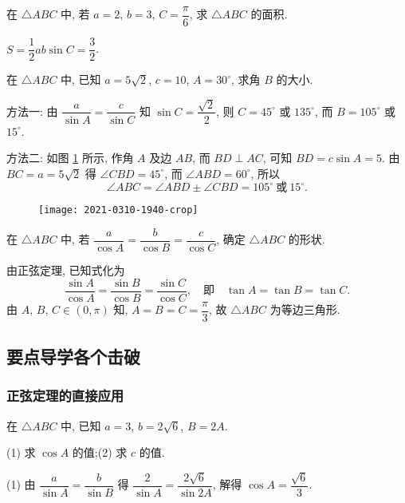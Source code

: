 \begin{exercise}
    在 $\triangle ABC$ 中, 若 $a=2$, $b=3$, $C=\dfrac\pi6$, 
    求 $\triangle ABC$ 的面积.
\end{exercise}
\beginsolution
    $S= \dfrac12 ab\sin C= \dfrac32$.
\endsolution

\begin{exercise}
    在 $\triangle ABC$ 中, 已知 $a=5\sqrt2$, $c=10$, $A=30^\circ$, 求角 $B$ 的大小.
\end{exercise}
\beginsolution
    方法一: 由 $\dfrac{a}{\sin A}= \dfrac{c}{\sin C}$ 知 $\sin C= \dfrac{\sqrt2}{2}$, 则 $C=45^\circ$ 或 $135^\circ$, 而 $B=105^\circ$ 或 $15^\circ$.

    方法二: 如图 \ref{fig:2021-0310-1940} 所示, 
    作角 $A$ 及边 $AB$, 而 $BD\perp AC$, 可知 $BD= c\sin A= 5$. 由 $BC= a= 5\sqrt2$ 得 $\angle CBD= 45^\circ$, 而 $\angle ABD= 60^\circ$, 所以
    \[\angle ABC= \angle ABD\pm \angle CBD= 105^\circ\ 
        \text{或}\ 15^\circ.\]

    \begin{figure}[hb]
        \small\centering
        \texttt{[image: 2021-0310-1940-crop]}
        \caption{}\label{fig:2021-0310-1940}
    \end{figure}
\endsolution

\begin{exercise}
    在 $\triangle ABC$ 中, 若 $\dfrac{a}{\cos A}= \dfrac{b}{\cos B} 
       = \dfrac{c}{\cos C}$, 确定 $\triangle ABC$ 的形状.
\end{exercise}
\beginsolution
    由正弦定理, 已知式化为
    \[\dfrac{\sin A}{\cos A}= \dfrac{\sin B}{\cos B}
        = \dfrac{\sin C}{\cos C},\quad\text{即}\quad
        \tan A= \tan B= \tan C.\]
    由 $A$, $B$, $C\in (0,\pi)$ 知, $A=B=C= \dfrac\pi3$, 故 $\triangle ABC$ 为等边三角形.  
\endsolution

\subsection{要点导学\quad 各个击破}
\subsubsection{正弦定理的直接应用}
\begin{example}
    在 $\triangle ABC$ 中, 已知 $a=3$, $b=2\sqrt6$, $B=2A$.
    
    (1) 求 $\cos A$ 的值;\qquad  (2) 求 $c$ 的值.
\end{example}
\beginsolution
    (1) 由 $\dfrac{a}{\sin A}= \dfrac{b}{\sin B}$ 得 $\dfrac{2}{\sin A}= \dfrac{2\sqrt6}{\sin 2A}$, 解得 $\cos A= \dfrac{\sqrt6}{3}$.

